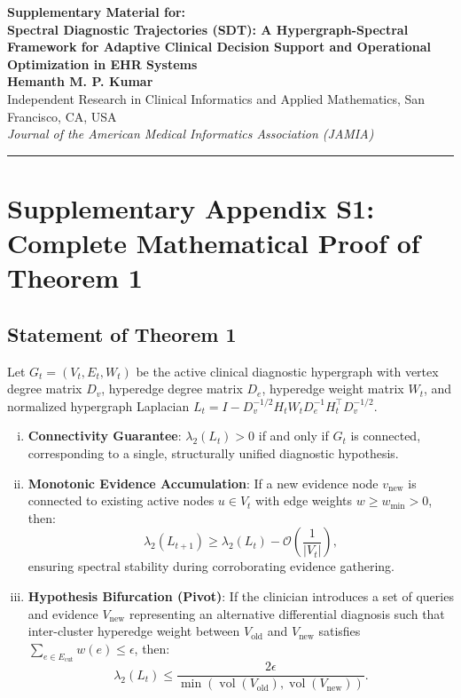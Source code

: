 \documentclass[11pt]{article}
\DeclareMathOperator{\vol}{vol}
\begin{document}
\begin{center}
  {\Large \textbf{Supplementary Material for:}}\\[6pt]
  {\Large \textbf{Spectral Diagnostic Trajectories (SDT): A Hypergraph-Spectral Framework for Adaptive Clinical Decision Support and Operational Optimization in EHR Systems}}\\[12pt]
  \textbf{Hemanth M. P. Kumar}\\[4pt]
  {\small Independent Research in Clinical Informatics and Applied Mathematics, San Francisco, CA, USA}\\[6pt]
  \textit{Journal of the American Medical Informatics Association (JAMIA)}
\end{center}

\vspace{0.8cm}
\tableofcontents
\vspace{0.8cm}
\hrule
\vspace{0.8cm}

\section{Supplementary Appendix S1: Complete Mathematical Proof of Theorem 1}

\subsection{Statement of Theorem 1}
Let $G_t = (V_t, E_t, W_t)$ be the active clinical diagnostic hypergraph with vertex degree matrix $D_v$, hyperedge degree matrix $D_e$, hyperedge weight matrix $W_t$, and normalized hypergraph Laplacian $L_t = I - D_v^{-1/2} H_t W_t D_e^{-1} H_t^\top D_v^{-1/2}$.
\begin{enumerate}[(i)]
  \item \textbf{Connectivity Guarantee}: $\lambda_2(L_t) > 0$ if and only if $G_t$ is connected, corresponding to a single, structurally unified diagnostic hypothesis.
  \item \textbf{Monotonic Evidence Accumulation}: If a new evidence node $v_{\text{new}}$ is connected to existing active nodes $u \in V_t$ with edge weights $w \ge w_{\min} > 0$, then:
  \begin{equation}
    \lambda_2(L_{t+1}) \ge \lambda_2(L_t) - \mathcal{O}\!\left(\frac{1}{|V_t|}\right),
  \end{equation}
  ensuring spectral stability during corroborating evidence gathering.
  \item \textbf{Hypothesis Bifurcation (Pivot)}: If the clinician introduces a set of queries and evidence $V_{\text{new}}$ representing an alternative differential diagnosis such that inter-cluster hyperedge weight between $V_{\text{old}}$ and $V_{\text{new}}$ satisfies $\sum_{e \in E_{\text{cut}}} w(e) \le \epsilon$, then:
  \begin{equation}
    \lambda_2(L_t) \le \frac{2 \epsilon}{\min(\vol(V_{\text{old}}), \vol(V_{\text{new}}))}.
  \end{equation}
\end{enumerate}
\end{document}
